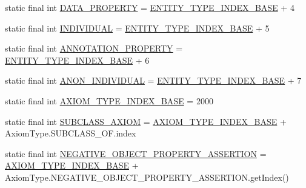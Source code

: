 \begin{DoxyCompactItemize}
\item 
static final int \hyperlink{classorg_1_1semanticweb_1_1owlapi_1_1util_1_1_o_w_l_object_type_index_provider_a72d91e99333065f680ac4e8109dcbab6}{D\-A\-T\-A\-\_\-\-P\-R\-O\-P\-E\-R\-T\-Y} = \hyperlink{classorg_1_1semanticweb_1_1owlapi_1_1util_1_1_o_w_l_object_type_index_provider_aea540c2bf120be0ba29ce856a8f2c36f}{E\-N\-T\-I\-T\-Y\-\_\-\-T\-Y\-P\-E\-\_\-\-I\-N\-D\-E\-X\-\_\-\-B\-A\-S\-E} + 4
\item 
static final int \hyperlink{classorg_1_1semanticweb_1_1owlapi_1_1util_1_1_o_w_l_object_type_index_provider_a8ed6ca929b170a2339e211fb3dc10ee8}{I\-N\-D\-I\-V\-I\-D\-U\-A\-L} = \hyperlink{classorg_1_1semanticweb_1_1owlapi_1_1util_1_1_o_w_l_object_type_index_provider_aea540c2bf120be0ba29ce856a8f2c36f}{E\-N\-T\-I\-T\-Y\-\_\-\-T\-Y\-P\-E\-\_\-\-I\-N\-D\-E\-X\-\_\-\-B\-A\-S\-E} + 5
\item 
static final int \hyperlink{classorg_1_1semanticweb_1_1owlapi_1_1util_1_1_o_w_l_object_type_index_provider_af4c886f598fc7592792797056b5ce3ec}{A\-N\-N\-O\-T\-A\-T\-I\-O\-N\-\_\-\-P\-R\-O\-P\-E\-R\-T\-Y} = \hyperlink{classorg_1_1semanticweb_1_1owlapi_1_1util_1_1_o_w_l_object_type_index_provider_aea540c2bf120be0ba29ce856a8f2c36f}{E\-N\-T\-I\-T\-Y\-\_\-\-T\-Y\-P\-E\-\_\-\-I\-N\-D\-E\-X\-\_\-\-B\-A\-S\-E} + 6
\item 
static final int \hyperlink{classorg_1_1semanticweb_1_1owlapi_1_1util_1_1_o_w_l_object_type_index_provider_a7cd066cec7c5fa84e91a23e98d17e174}{A\-N\-O\-N\-\_\-\-I\-N\-D\-I\-V\-I\-D\-U\-A\-L} = \hyperlink{classorg_1_1semanticweb_1_1owlapi_1_1util_1_1_o_w_l_object_type_index_provider_aea540c2bf120be0ba29ce856a8f2c36f}{E\-N\-T\-I\-T\-Y\-\_\-\-T\-Y\-P\-E\-\_\-\-I\-N\-D\-E\-X\-\_\-\-B\-A\-S\-E} + 7
\item 
static final int \hyperlink{classorg_1_1semanticweb_1_1owlapi_1_1util_1_1_o_w_l_object_type_index_provider_a4e37deb44b28debd12f8be9dd0826661}{A\-X\-I\-O\-M\-\_\-\-T\-Y\-P\-E\-\_\-\-I\-N\-D\-E\-X\-\_\-\-B\-A\-S\-E} = 2000
\item 
static final int \hyperlink{classorg_1_1semanticweb_1_1owlapi_1_1util_1_1_o_w_l_object_type_index_provider_a0edbf779b39f933b1ad25bb1ee16267d}{S\-U\-B\-C\-L\-A\-S\-S\-\_\-\-A\-X\-I\-O\-M} = \hyperlink{classorg_1_1semanticweb_1_1owlapi_1_1util_1_1_o_w_l_object_type_index_provider_a4e37deb44b28debd12f8be9dd0826661}{A\-X\-I\-O\-M\-\_\-\-T\-Y\-P\-E\-\_\-\-I\-N\-D\-E\-X\-\_\-\-B\-A\-S\-E} + Axiom\-Type.\-S\-U\-B\-C\-L\-A\-S\-S\-\_\-\-O\-F.\-index
\item 
static final int \hyperlink{classorg_1_1semanticweb_1_1owlapi_1_1util_1_1_o_w_l_object_type_index_provider_a570619e9efe90c428a1115abd0c90cac}{N\-E\-G\-A\-T\-I\-V\-E\-\_\-\-O\-B\-J\-E\-C\-T\-\_\-\-P\-R\-O\-P\-E\-R\-T\-Y\-\_\-\-A\-S\-S\-E\-R\-T\-I\-O\-N} = \hyperlink{classorg_1_1semanticweb_1_1owlapi_1_1util_1_1_o_w_l_object_type_index_provider_a4e37deb44b28debd12f8be9dd0826661}{A\-X\-I\-O\-M\-\_\-\-T\-Y\-P\-E\-\_\-\-I\-N\-D\-E\-X\-\_\-\-B\-A\-S\-E} + Axiom\-Type.\-N\-E\-G\-A\-T\-I\-V\-E\-\_\-\-O\-B\-J\-E\-C\-T\-\_\-\-P\-R\-O\-P\-E\-R\-T\-Y\-\_\-\-A\-S\-S\-E\-R\-T\-I\-O\-N.\-get\-Index()

\end{DoxyCompactItemize}
